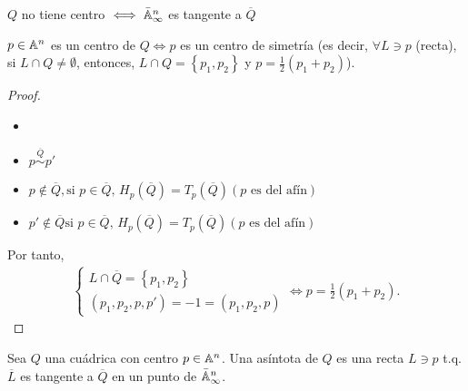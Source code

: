 \begin{obs}
    $Q$ no tiene centro $\iff \bar{\mathbb{A}}^n_\infty$ es tangente a $\overline{Q}$
\end{obs}
\begin{obs}
    $p \in \mathbb{A}^n$ es un centro de $Q \iff p$ es un centro de simetría (es decir, $\forall L\ni p$ (recta), si $L\cap Q\neq \emptyset$, entonces, $L\cap Q = \left\{ p_1, p_2 \right\}$ y $p = \frac{1}{2}\left( p_1 + p_2 \right)$).
\end{obs}
\begin{proof}
    \begin{itemize}
        \item[]
        \item $p \stackrel{\overline{Q}}{\sim} p'$
        \item $p \notin \overline{Q}, \text{si } p\in\overline{Q}, \, H_p\left( \overline{Q} \right) = T_p \left( \overline{Q} \right) \left( p\text{ es del afín} \right)$
        \item $p' \notin \overline{Q} \text{si } p\in\overline{Q}, \, H_p\left( \overline{Q} \right) = T_p \left( \overline{Q} \right) \left( p\text{ es del afín} \right)$
    \end{itemize}
    Por tanto,
    \begin{gather*}
        \begin{cases}
            L\cap\overline{Q} = \left\{ p_1, p_2 \right\} \\
            \left( p_1, p_2, p, p' \right) = -1 = \left( p_1, p_2, p \right)
        \end{cases}
        \iff p = \frac{1}{2}\left( p_1 + p_2 \right).
    \end{gather*}
\end{proof}
\begin{defi}
    Sea $Q$ una cuádrica con centro $p\in\mathbb{A}^n$. Una asíntota de $Q$ es una recta $L \ni p$ t.q. $\overline{L}$ es tangente a $\overline{Q}$ en un punto de $\bar{\mathbb{A}}_\infty^n$.
\end{defi}
